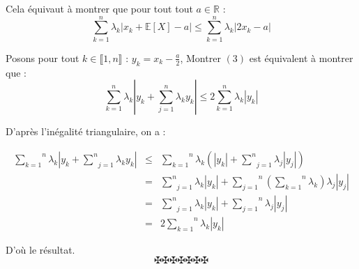 Cela {\'e}quivaut {\`a} montrer que pour tout tout $a \in \mathbb{R}$ :
\begin{equation}
  \overset{n}{\underset{k = 1}{\sum}} \lambda_k | x_k +\mathbb{E} [X] - a |
  \leqslant \overset{n}{\underset{k = 1}{\sum}} \lambda_k | 2 x_k - a |
\end{equation}
\[ \  \]


Posons pour tout $k \in \llbracket 1, n \rrbracket$ : $y_k = x_k -
\frac{a}{2}$, Montrer $(3)$ est {\'e}quivalent {\`a} montrer que :
\[ \overset{n}{\underset{k = 1}{\sum}} \lambda_k \left| y_k + \underset{j =
   1}{\overset{n}{\sum}} \lambda_k y_k \right| \leqslant 2
   \overset{n}{\underset{k = 1}{\sum}} \lambda_k | y_k | \]


D'apr{\`e}s l'in{\'e}galit{\'e} triangulaire, on a :


\begin{eqnarray*}
  \overset{n}{\underset{k = 1}{\sum}} \lambda_k \left| y_k + \underset{j =
  1}{\overset{n}{\sum}} \lambda_k y_k \right| & \leqslant &
  \overset{n}{\underset{k = 1}{\sum}} \lambda_k \left( | y_k | + \underset{j =
  1}{\overset{n}{\sum}} \lambda_j | y_j | \right)\\
  & = & \underset{j = 1}{\overset{n}{\sum}} \lambda_k | y_k | +
  \overset{n}{\underset{j = 1}{\sum}} \left( \overset{n}{\underset{k =
  1}{\sum}} \lambda_k \right) \lambda_j | y_j |\\
  & = & \underset{j = 1}{\overset{n}{\sum}} \lambda_k | y_k | +
  \overset{n}{\underset{j = 1}{\sum}} \lambda_j | y_j |\\
  & = & 2 \overset{n}{\underset{k = 1}{\sum}} \lambda_k | y_k |
\end{eqnarray*}


D'o{\`u} le r{\'e}sultat.
\[ \maltese \maltese \maltese \maltese \maltese \maltese \maltese \]
